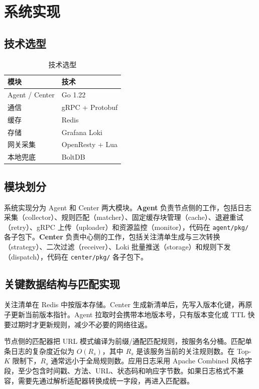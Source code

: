 \section{系统实现}

\subsection{技术选型}
\begin{table}[htbp]
  \centering
  \caption{技术选型}
  \label{tab:tech}
  \begin{tabular}{ll}
    \toprule
    模块 & 技术 \\
    \midrule
    Agent / Center & Go 1.22 \\
    通信 & gRPC + Protobuf \\
    缓存 & Redis \\
    存储 & Grafana Loki \\
    网关采集 & OpenResty + Lua \\
    本地兜底 & BoltDB \\
    \bottomrule
  \end{tabular}
\end{table}

\subsection{模块划分}
系统实现分为 Agent 和 Center 两大模块。\textbf{Agent} 负责节点侧的工作，包括日志采集（collector）、规则匹配（matcher）、固定缓存块管理（cache）、退避重试（retry）、gRPC 上传（uploader）和资源监控（monitor），代码在 \texttt{agent/pkg/} 各子包下。\textbf{Center} 负责中心侧的工作，包括关注清单生成与三次转换（strategy）、二次过滤（receiver）、Loki 批量推送（storage）和规则下发（dispatch），代码在 \texttt{center/pkg/} 各子包下。

\subsection{关键数据结构与匹配实现}
关注清单在 Redis 中按版本存储。Center 生成新清单后，先写入版本化键，再原子更新当前版本指针。Agent 拉取时会携带本地版本号，只有版本变化或 TTL 快要过期时才更新规则，减少不必要的网络往返。

节点侧的匹配器把 URL 模式编译为前缀/通配匹配规则，按服务名分桶。匹配单条日志的复杂度近似为 $O(R_s)$，其中 $R_s$ 是该服务当前的关注规则数。在 Top-$K$ 限制下，$R_s$ 通常远小于全局规则数。应用日志采用 Apache Combined 风格字段，至少包含时间戳、方法、URL、状态码和响应字节数。如果日志格式不兼容，需要先通过解析适配器转换成统一字段，再进入匹配器。

